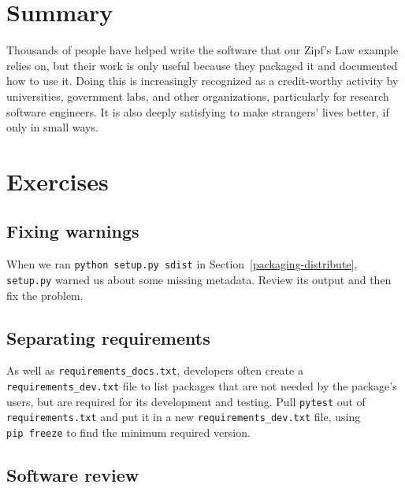 \documentclass[
]{krantz}
\begin{document}
\hypertarget{packaging-summary}{%
\section{Summary}\label{packaging-summary}}

Thousands of people have helped write the software that our Zipf's Law example relies on,
but their work is only useful because they packaged it
and documented how to use it.
Doing this is increasingly recognized as a credit-worthy activity
by universities, government labs, and other organizations,
particularly for research software engineers.
It is also deeply satisfying to make strangers' lives better,
if only in small ways.

\hypertarget{exercises}{%
\section{Exercises}\label{exercises}}

\hypertarget{packaging-ex-fixing-warnings}{%
\subsection{Fixing warnings}\label{packaging-ex-fixing-warnings}}

When we ran \texttt{python\ setup.py\ sdist} in Section~\ref{packaging-distribute},
\texttt{setup.py} warned us about some missing metadata.
Review its output and then fix the problem.

\hypertarget{packaging-ex-separating-requirements}{%
\subsection{Separating requirements}\label{packaging-ex-separating-requirements}}

As well as \texttt{requirements\_docs.txt},
developers often create a \texttt{requirements\_dev.txt} file
to list packages that are not needed by the package's users,
but are required for its development and testing.
Pull \texttt{pytest} out of \texttt{requirements.txt} and put it in a new \texttt{requirements\_dev.txt} file,
using \texttt{pip\ freeze} to find the minimum required version.

\hypertarget{packaging-ex-software-review}{%
\subsection{Software review}\label{packaging-ex-software-review}}
\end{document}
